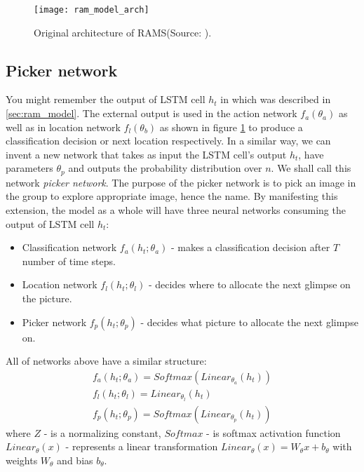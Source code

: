 \begin{figure}[h!]
	\texttt{[image: ram\_model\_arch]}
	\caption{Original architecture of RAMS(Source: \cite{DBLP:journals/corr/MnihHGK14}).}
	\label{fig:ram_model_arch}
\end{figure}

\subsection{Picker network}
\label{subs:picker_net}
You might remember the output of LSTM cell $h_t$ in \cite{DBLP:journals/corr/MnihHGK14}
which was described in \autoref{sec:ram_model}.
The external output is used
in the action network $f_a(\theta_a)$ as well as in location network $f_l(\theta_b)$
as shown in figure \ref{fig:ram_model_arch} to produce a classification decision or
next location respectively. In a similar way, we can invent a new network that takes as
input the LSTM cell's output $h_t$, have parameters $\theta_p$ and outputs
the probability distribution over $n$. We shall call this network
\emph{picker network}. The purpose of the picker network is to pick an image
in the group to explore appropriate image, hence the name. By manifesting
this extension, the model as a whole will have three neural networks consuming
the output of LSTM cell $h_t$:
\begin{itemize}
	\item Classification network $f_a(h_t; \theta_a)$ - makes a classification
		decision after $T$ number of time steps.
	\item Location network $f_l(h_t; \theta_l)$ - decides where to allocate the next glimpse
	on the picture.
	\item Picker network $f_p(h_t; \theta_p)$ - decides what picture to allocate the next glimpse on.
\end{itemize}

All of networks above have a similar structure:
\begin{align} \label{eq:picker_network}
	f_a(h_t; \theta_a) = Softmax(Linear_{\theta_a}(h_t)) \\
	f_l(h_t; \theta_l) = Linear_{\theta_l}(h_t) \\
	f_p(h_t; \theta_p) = Softmax(Linear_{\theta_p}(h_t))
\end{align}
where $Z$ - is a normalizing constant, $Softmax$ - is softmax activation function
$Linear_{\theta}(x)$ - represents
a linear transformation $Linear_{\theta}(x) = W_{\theta}x+b_{\theta}$ with weights
$W_{\theta}$ and bias $b_{\theta}$.


